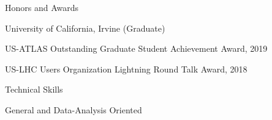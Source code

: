 \begin{minipage}{0.8\textwidth}
\begin{minipage}{\textwidth}
\vspace{0.2in}
{\Large Honors and Awards}\\
\HRule

\hspace{0.25in}
\begin{minipage}{0.8\textwidth}

    \vspace{0.15in}
    University of California, Irvine (Graduate)
    
	\vspace{0.05in}
    \hspace{0.15in}
    \begin{minipage}{1.0\textwidth}
        \vspace{0.1in}
        US-ATLAS Outstanding Graduate Student Achievement Award, 2019

        \vspace{0.1in}
        US-LHC Users Organization Lightning Round Talk Award, 2018
    \end{minipage}
\end{minipage}


		




\vspace{0.35in}
{\Large Technical Skills} \\
\HRule
\vspace{0.15in}

\hspace{0.2in}
General and Data-Analysis Oriented
\vspace{0.1in}


\end{minipage}
\end{minipage}
